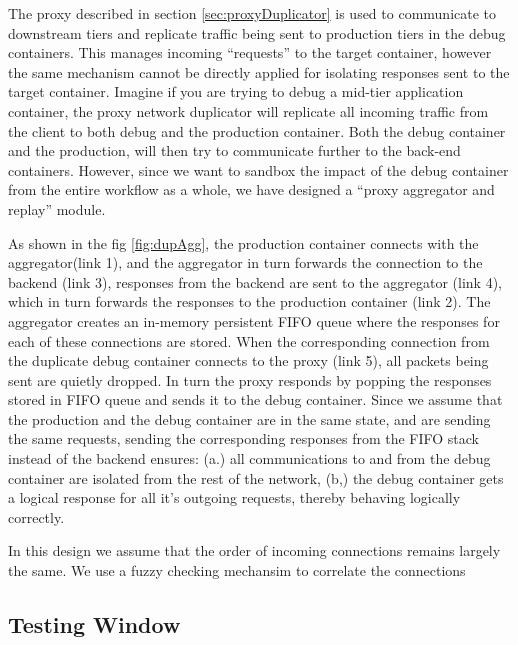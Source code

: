 The proxy described in section \ref{sec:proxyDuplicator} is used to communicate to downstream tiers and replicate traffic being sent to production tiers in the debug containers.
This manages incoming ``requests'' to the target container, however the same mechanism cannot be directly applied for isolating responses sent to the target container. 
Imagine if you are trying to debug a mid-tier application container, the proxy network duplicator will replicate all incoming traffic from the client to both debug and the production container. 
Both the debug container and the production, will then try to communicate further to the back-end containers.
However, since we want to sandbox the impact of the debug container from the entire workflow as a whole, we have designed a ``proxy aggregator and replay'' module.

As shown in the fig \ref{fig:dupAgg}, the production container connects with the aggregator(link 1), and the aggregator in turn forwards the connection to the backend (link 3), responses from the backend are sent to the aggregator (link 4), which in turn forwards the responses to the production container (link 2).
The aggregator creates an in-memory persistent FIFO queue where the responses for each of these connections are stored.
When the corresponding connection from the duplicate debug container connects to the proxy (link 5), all packets being sent are quietly dropped.
In turn the proxy responds by popping the responses stored in FIFO queue and sends it to the debug container.
Since we assume that the production and the debug container are in the same state, and are sending the same requests, sending the corresponding responses from the FIFO stack instead of the backend ensures: (a.) all communications to and from the debug container are isolated from the rest of the network, (b,) the debug container gets a logical response for all it's outgoing requests, thereby behaving logically correctly.

In this design we assume that the order of incoming connections remains largely the same.
We use a fuzzy checking mechansim to correlate the connections


\subsection{Testing Window}
\label{sec:window}

